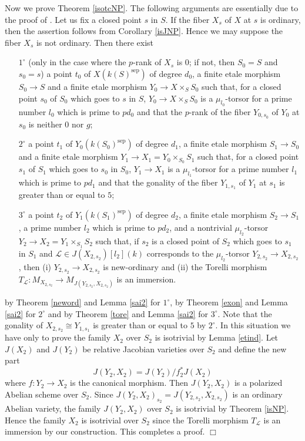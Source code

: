 \documentclass[11pt]{amsart}
\begin{document}
Now we prove Theorem \ref{isotcNP}. 
The following arguments are essentially due to the proof of \cite[Theomre 4.6]{saidi}. 
Let us fix a closed point $s$ in $S$. If the fiber $X_s$ of $X$ at $s$ is ordinary, then 
the assertion follows from Corollary \ref{isJNP}. 
Hence we may suppose the fiber $X_s$ is not ordinary. 
Then there exist 
\begin{enumerate}
\item[$1^\circ$] (only in the case where the $p$-rank of $X_s$ is $0$; 
if not, then $S_0 = S$ and $s_0 = s$) a point $t_0$ of $X(k(S)^{\mathrm{sep}})$ 
of degree $d_0$, a finite etale morphism 
$S_0 \rightarrow S$ and a finite etale morphism 
$Y_0 \rightarrow X \times_SS_0$ such that, for a closed point $s_0$ of $S_0$ which goes to $s$ in $S$, 
$Y_0 \rightarrow X \times_SS_0$ is a $\mu_{l_0}$-torsor 
for a prime number $l_0$ which is prime to $pd_0$ and that 
the $p$-rank of the fiber $Y_{0, s_0}$ of $Y_0$ at $s_0$ is neither $0$ nor $g$;
\item[$2^\circ$] a point $t_1$ of $Y_0(k(S_0)^{\mathrm{sep}})$ 
of degree $d_1$, a finite etale morphism $S_1 \rightarrow S_0$ and a finite etale morphism 
$Y_1 \rightarrow X_1 = Y_0 \times_{S_0}S_1$ such that, for a closed point $s_1$ of $S_1$ which goes to $s_0$ in $S_0$, 
$Y_1 \rightarrow X_1$ is a $\mu_{l_1}$-torsor 
for a prime number $l_1$ which is prime to $pd_1$ and that 
the gonality of the fiber $Y_{1, s_1}$ of $Y_1$ at $s_1$ is greater than or equal to $5$;
\item[$3^\circ$] a point $t_2$ of $Y_1(k(S_1)^{\mathrm{sep}})$ 
of degree $d_2$, a finite etale morphism $S_2 \rightarrow S_1$, a prime number $l_2$ which is prime to $pd_2$, 
and a nontrivial $\mu_{l_2}$-torsor $Y_2 \rightarrow X_2 = Y_1 \times_{S_1}S_2$ such that, 
if $s_2$ is a closed point of $S_2$ which goes to $s_1$ in $S_1$ and 
$\mathcal L \in J(X_{2, s_2})[l_2](k)$ corresponds to 
the $\mu_{l_2}$-torsor $Y_{2, s_2} \rightarrow X_{2,s_2}$, then 
(i) $Y_{2, s_2} \rightarrow X_{2,s_2}$ is new-ordinary and 
(ii) the Torelli morphism $T_{\mathcal L} : M_{X_{2, s_2}} \rightarrow M_{J(Y_{2, s_2}, X_{2,s_2})}$ is an immersion.
\end{enumerate}
by Theorem \ref{neword} and Lemma \ref{sai2} for $1^\circ$, 
by Theorem \ref{exon} and Lemma \ref{sai2} for $2^\circ$ 
and by Theorem \ref{tore} and Lemma \ref{sai2} for $3^\circ$. 
Note that the gonality of $X_{2, s_2} \cong Y_{1, s_1}$ is greater than or equal to $5$ by $2^\circ$. 
In this situation we have only to prove the family $X_2$ over $S_2$ is isotrivial by Lemma \ref{etind}. 
Let $J(X_2)$ and $J(Y_2)$ be relative Jacobian varieties over $S_2$ and define the new part 
$$
          J(Y_2, X_2) = J(Y_2)/f_2^\ast J(X_2)
$$
where $f : Y_2 \rightarrow X_2$ is the canonical morphism. 
Then $J(Y_2, X_2)$ is a polarized Abelian scheme over $S_2$. 
Since $J(Y_2, X_2)_{s_2} = J(Y_{2, s_2}, X_{2,s_2})$ is an ordinary Abelian variety, the family $J(Y_2, X_2)$ over $S_2$ 
is isotrivial by Theorem \ref{isNP}. Hence the family $X_2$ is isotrivial over $S_2$ 
since the Torelli morphism $T_{\mathcal L}$ is an immersion by our construction. 
This completes a proof. 
\hspace*{\fill} $\Box$
\end{document}
